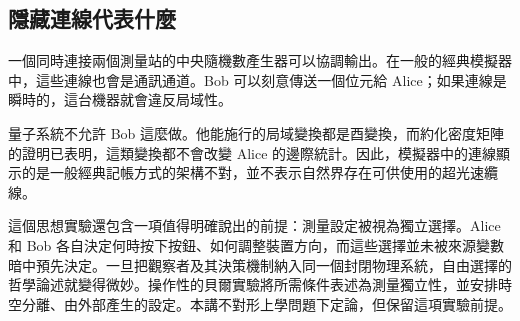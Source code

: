 \begin{classroomqa}
\end{classroomqa}

\subsection{隱藏連線代表什麼}

一個同時連接兩個測量站的中央隨機數產生器可以協調輸出。在一般的經典模擬器中，這些連線也會是通訊通道。Bob 可以刻意傳送一個位元給 Alice；如果連線是瞬時的，這台機器就會違反局域性。

量子系統不允許 Bob 這麼做。他能施行的局域變換都是酉變換，而約化密度矩陣的證明已表明，這類變換都不會改變 Alice 的邊際統計。因此，模擬器中的連線顯示的是一般經典記帳方式的架構不對，並不表示自然界存在可供使用的超光速纜線。

\begin{classroomqa}
\end{classroomqa}

\begin{classroomqa}
\end{classroomqa}

這個思想實驗還包含一項值得明確說出的前提：測量設定被視為獨立選擇。Alice 和 Bob 各自決定何時按下按鈕、如何調整裝置方向，而這些選擇並未被來源變數暗中預先決定。一旦把觀察者及其決策機制納入同一個封閉物理系統，自由選擇的哲學論述就變得微妙。操作性的貝爾實驗將所需條件表述為測量獨立性，並安排時空分離、由外部產生的設定。本講不對形上學問題下定論，但保留這項實驗前提。

\begin{classroomqa}
\end{classroomqa}

